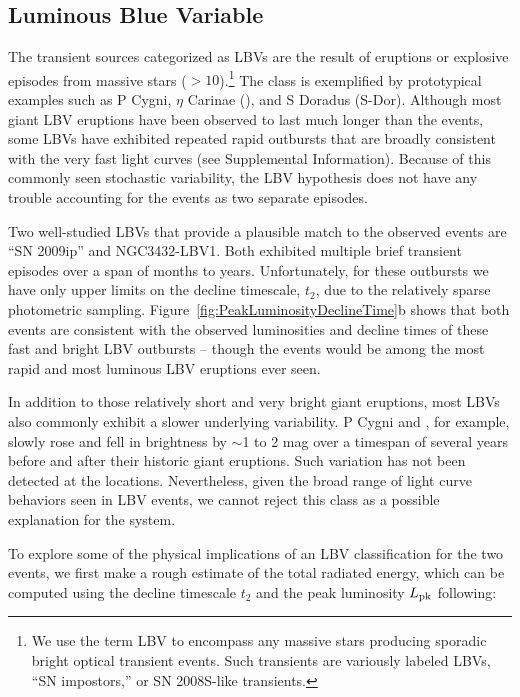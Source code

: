 \subsection{Luminous Blue Variable}

The transient sources categorized as LBVs are the result of eruptions
or explosive episodes from massive stars ($>10$\Msun).\footnote{We use
  the term LBV to encompass any massive stars producing sporadic
  bright optical transient events. Such
  transients are variously labeled LBVs, ``SN impostors,'' or SN
  2008S-like transients.}   The class is
exemplified by prototypical examples such as P Cygni, $\eta$ Carinae
(\etacar), and S Doradus (S-Dor)\cite{Smith:2011b, Kochanek:2012}.  Although most giant
LBV eruptions have been observed to last much longer than the \spock
events\cite{Smith:2011b}, some LBVs have exhibited repeated rapid
outbursts that are broadly consistent with the very fast \spock light
curves (see Supplemental Information). Because of this commonly
seen stochastic variability, the LBV hypothesis does not have any
trouble accounting for the \spock events as two separate episodes.

Two well-studied LBVs that provide a plausible match to the observed
\spock events are ``SN 2009ip''\cite{Maza:2009} and NGC3432-LBV1\cite{Pastorello:2010}.  Both exhibited multiple brief transient
episodes over a span of months to years\cite{Miller:2009,
  Li:2009, Berger:2009, Drake:2010, Pastorello:2010}.  Unfortunately,
for these outbursts we have only upper limits on the decline
timescale, $t_2$, due to the relatively sparse photometric sampling.
Figure~\ref{fig:PeakLuminosityDeclineTime}b shows that both \spock
events are consistent with the observed luminosities and decline times
of these fast and bright LBV outbursts -- though the \spock events
would be among the most rapid and most luminous LBV eruptions ever
seen.

In addition to those relatively short and very bright giant eruptions,
most LBVs also commonly exhibit a slower underlying variability. P
Cygni and \etaCar, for example, slowly rose and fell in brightness by
$\sim$1 to 2 mag over a timespan of several years before and after
their historic giant eruptions.  Such variation has not been detected
at the \spock locations. Nevertheless, given the broad
range of light curve behaviors seen in LBV events, we cannot reject
this class as a possible explanation for the \spock system.

To explore some of the physical implications of an LBV
classification for the two \spock events, we first make a rough
estimate of the total radiated energy, which can be computed using the
decline timescale $t_2$ and the peak luminosity $L_{\rm pk}$ following\cite{Smith:2011b}:

